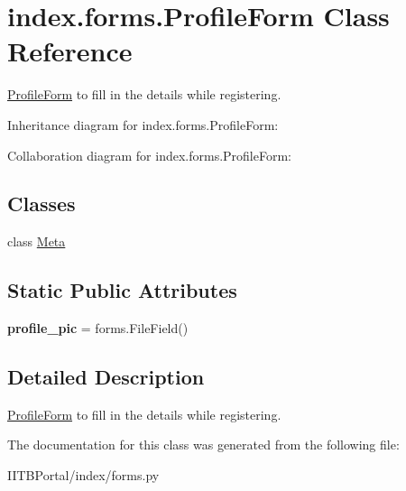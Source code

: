 \hypertarget{classindex_1_1forms_1_1ProfileForm}{}\section{index.\+forms.\+Profile\+Form Class Reference}
\label{classindex_1_1forms_1_1ProfileForm}


\hyperlink{classindex_1_1forms_1_1ProfileForm}{Profile\+Form} to fill in the details while registering.  




Inheritance diagram for index.\+forms.\+Profile\+Form\+:


Collaboration diagram for index.\+forms.\+Profile\+Form\+:
\subsection*{Classes}
\begin{DoxyCompactItemize}
\item 
class \hyperlink{classindex_1_1forms_1_1ProfileForm_1_1Meta}{Meta}
\end{DoxyCompactItemize}
\subsection*{Static Public Attributes}
\begin{DoxyCompactItemize}
\item 
\mbox{\label{classindex_1_1forms_1_1ProfileForm_a850a8a50f53136cccb0c48983820d109}} 
{\bfseries profile\+\_\+pic} = forms.\+File\+Field()
\end{DoxyCompactItemize}


\subsection{Detailed Description}
\hyperlink{classindex_1_1forms_1_1ProfileForm}{Profile\+Form} to fill in the details while registering. 



The documentation for this class was generated from the following file\+:\begin{DoxyCompactItemize}
\item 
I\+I\+T\+B\+Portal/index/forms.\+py\end{DoxyCompactItemize}
